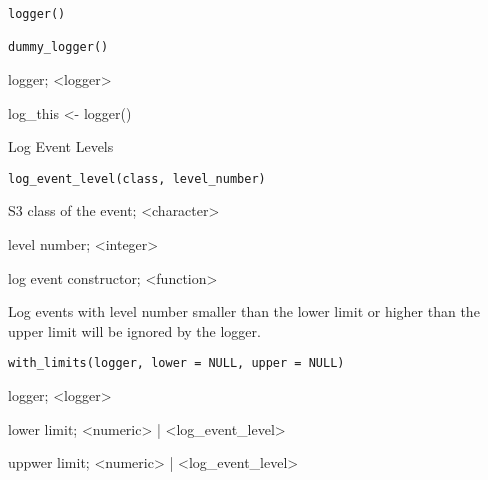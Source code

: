 \documentclass[letterpaper]{book}
\begin{document}
%
\begin{Usage}
\begin{verbatim}
logger()

dummy_logger()
\end{verbatim}
\end{Usage}
%
\begin{Value}
logger; <logger>
\end{Value}
%
\begin{Examples}
\begin{ExampleCode}

log_this <- logger()

\end{ExampleCode}
\end{Examples}
%
\begin{Description}
Log Event Levels
\end{Description}
%
\begin{Usage}
\begin{verbatim}
log_event_level(class, level_number)
\end{verbatim}
\end{Usage}
%
\begin{Arguments}
\begin{ldescription}
\item[\code{class}] S3 class of the event; <character>

\item[\code{level\_number}] level number; <integer>
\end{ldescription}
\end{Arguments}
%
\begin{Value}
log event constructor; <function>
\end{Value}
%
\begin{Description}
Log events with level number smaller than the lower limit or
higher than the upper limit will be ignored by the logger.
\end{Description}
%
\begin{Usage}
\begin{verbatim}
with_limits(logger, lower = NULL, upper = NULL)
\end{verbatim}
\end{Usage}
%
\begin{Arguments}
\begin{ldescription}
\item[\code{logger}] logger; <logger>

\item[\code{lower}] lower limit; <numeric> | <log\_event\_level>

\item[\code{upper}] uppwer limit; <numeric> | <log\_event\_level>
\end{ldescription}
\end{Arguments}
\end{document}
